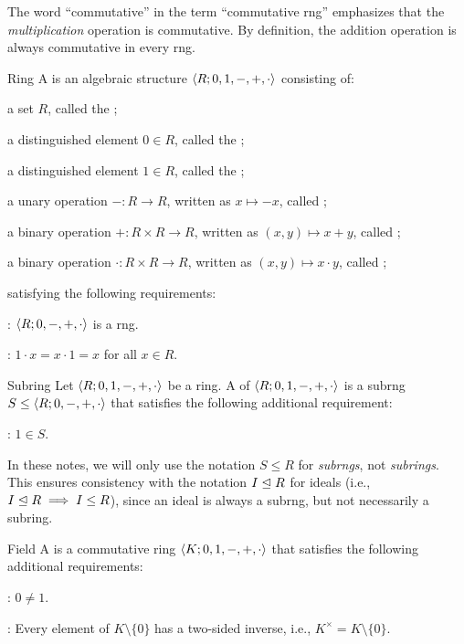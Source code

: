 \documentclass[12pt]{report}
\begin{document}
The word ``commutative'' in the term ``commutative rng'' emphasizes that the \textit{multiplication} operation is commutative. By definition, the addition operation is always commutative in every rng.

\begin{dfnbox}{Ring}
	A  is an algebraic structure ${\langle {R; 0, 1, -, +, \cdot} \rangle}$ consisting of:
	\begin{boxitems}
		\item a set $R$, called the ;
		\item a distinguished element $0 \in R$, called the ;
		\item a distinguished element $1 \in R$, called the ;
		\item a unary operation $-: R \to R$, written as $x \mapsto -x$, called ;
		\item a binary operation $+: R \times R \to R$, written as $(x, y) \mapsto x + y$, called ;
		\item a binary operation $\cdot: R \times R \to R$, written as $(x, y) \mapsto x \cdot y$, called ;
	\end{boxitems}
	satisfying the following requirements:
	\begin{boxitems}
		\item {}: ${\langle {R; 0, -, +, \cdot} \rangle}$ is a rng.
		\item {}: $1 \cdot x = x \cdot 1 = x$ for all $x \in R$.
	\end{boxitems}
\end{dfnbox}

\begin{dfnbox}{Subring}
	Let ${\langle {R; 0, 1, -, +, \cdot} \rangle}$ be a ring. A  of ${\langle {R; 0, 1, -, +, \cdot} \rangle}$ is a subrng $S \le {\langle {R; 0, -, +, \cdot} \rangle}$ that satisfies the following additional requirement:
	\begin{boxitems}
		\item {}: $1 \in S$.
	\end{boxitems}
\end{dfnbox}

In these notes, we will only use the notation $S \le R$ for \textit{subrngs}, not \textit{subrings}. This ensures consistency with the notation $I \trianglelefteq R$ for ideals (i.e., $I \trianglelefteq R \implies I \le R$), since an ideal is always a subrng, but not necessarily a subring.

\begin{dfnbox}{Field}
	A  is a commutative ring ${\langle {K; 0, 1, -, +, \cdot} \rangle}$ that satisfies the following additional requirements:
	\begin{boxitems}
		\item {}: $0 \ne 1$.
		\item {}: Every element of $K \setminus \{0\}$ has a two-sided inverse, i.e., $K^\times = K \setminus \{0\}$.
	\end{boxitems}
\end{dfnbox}
\end{document}
